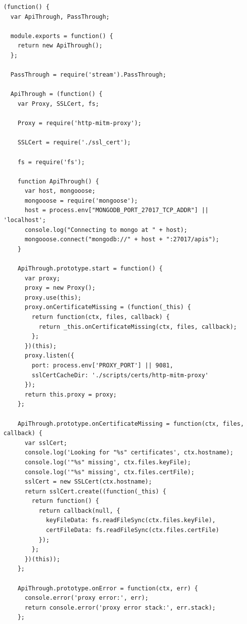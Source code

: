 \begin{lstlisting}[caption=lib/api\_through.js]
(function() {
  var ApiThrough, PassThrough;

  module.exports = function() {
    return new ApiThrough();
  };

  PassThrough = require('stream').PassThrough;

  ApiThrough = (function() {
    var Proxy, SSLCert, fs;

    Proxy = require('http-mitm-proxy');

    SSLCert = require('./ssl_cert');

    fs = require('fs');

    function ApiThrough() {
      var host, mongooose;
      mongooose = require('mongoose');
      host = process.env["MONGODB_PORT_27017_TCP_ADDR"] || 'localhost';
      console.log("Connecting to mongo at " + host);
      mongooose.connect("mongodb://" + host + ":27017/apis");
    }

    ApiThrough.prototype.start = function() {
      var proxy;
      proxy = new Proxy();
      proxy.use(this);
      proxy.onCertificateMissing = (function(_this) {
        return function(ctx, files, callback) {
          return _this.onCertificateMissing(ctx, files, callback);
        };
      })(this);
      proxy.listen({
        port: process.env['PROXY_PORT'] || 9081,
        sslCertCacheDir: './scripts/certs/http-mitm-proxy'
      });
      return this.proxy = proxy;
    };

    ApiThrough.prototype.onCertificateMissing = function(ctx, files, callback) {
      var sslCert;
      console.log('Looking for "%s" certificates', ctx.hostname);
      console.log('"%s" missing', ctx.files.keyFile);
      console.log('"%s" missing', ctx.files.certFile);
      sslCert = new SSLCert(ctx.hostname);
      return sslCert.create((function(_this) {
        return function() {
          return callback(null, {
            keyFileData: fs.readFileSync(ctx.files.keyFile),
            certFileData: fs.readFileSync(ctx.files.certFile)
          });
        };
      })(this));
    };

    ApiThrough.prototype.onError = function(ctx, err) {
      console.error('proxy error:', err);
      return console.error('proxy error stack:', err.stack);
    };


\end{lstlisting}
